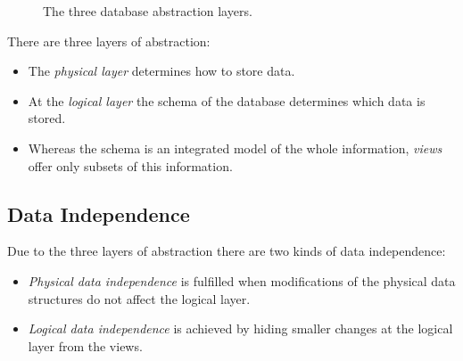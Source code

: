 \begin{figure}[htbp]
\begin{center}
\end{center}
\caption[Database Abstraction Layers]{The three database abstraction layers.}
\end{figure}

There are three layers of abstraction:
\begin{itemize}
\item The \emph{physical layer} determines how to store data.
\item At the \emph{logical layer} the schema of the database determines which data is stored.
\item Whereas the schema is an integrated model of the whole information, \emph{views} offer only subsets of this information.
\end{itemize}




\subsection{Data Independence}

Due to the three layers of abstraction there are two kinds of data independence:

\begin{itemize}
\item \emph{Physical data independence} is fulfilled when modifications of the physical data structures do not affect the logical layer.
\item \emph{Logical data independence} is achieved by hiding smaller changes at the logical layer from the views.
\end{itemize}

